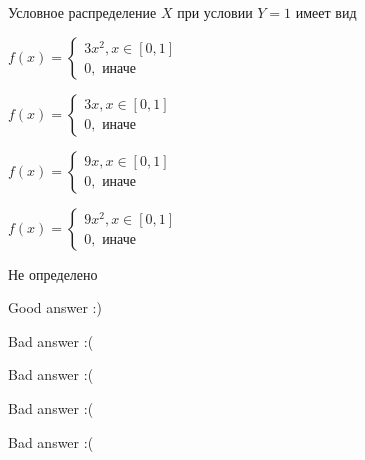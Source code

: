 
\begin{question}
Условное распределение \(X\) при условии \(Y=1\) имеет вид
\begin{answerlist}
  \item \(f(x) = \begin{cases} 3 x^2 , x \in [0,1] \\ 0,\text{ иначе} \end{cases}\)
  \item \(f(x) = \begin{cases} 3 x , x \in [0,1] \\ 0,\text{ иначе} \end{cases}\)
  \item \(f(x) = \begin{cases} 9 x , x \in [0,1] \\ 0,\text{ иначе} \end{cases}\)
  \item \(f(x) = \begin{cases} 9 x^2 , x \in [0,1] \\ 0,\text{ иначе} \end{cases}\)
  \item Не определено
\end{answerlist}
\end{question}

\begin{solution}
\begin{answerlist}
  \item Good answer :)
  \item Bad answer :(
  \item Bad answer :(
  \item Bad answer :(
  \item Bad answer :(
\end{answerlist}
\end{solution}

